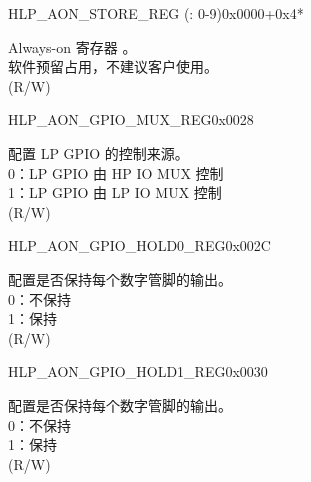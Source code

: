 \begin{register}{H}{LP\_AON\_STORE\_REG (: 0-9)}{0x0000+0x4*}\label{regdesc:LPAONSTORENREG}
%
\regnewline%
\begin{regdesc}\begin{reglist}
\label{fielddesc:LPAONLPAONSTOREN}\item [LP\_AON\_LP\_AON\_STORE\regindex{n}] Always-on 寄存器 。\\
软件预留占用，不建议客户使用。\\
(R/W)
\end{reglist}\end{regdesc}
\end{register}


\begin{register}{H}{LP\_AON\_GPIO\_MUX\_REG}{0x0028}\label{regdesc:LPAONGPIOMUXREG}
%
%
\regnewline%
\begin{regdesc}\begin{reglist}
\label{fielddesc:LPAONGPIOMUXSEL}\item [LP\_AON\_GPIO\_MUX\_SEL] 配置 LP GPIO 的控制来源。\\
0：LP GPIO 由 HP IO MUX 控制\\
1：LP GPIO 由 LP IO MUX 控制\\
(R/W)
\end{reglist}\end{regdesc}
\end{register}


\begin{register}{H}{LP\_AON\_GPIO\_HOLD0\_REG}{0x002C}\label{regdesc:LPAONGPIOHOLD0REG}
%
\regnewline%
\begin{regdesc}\begin{reglist}
\label{fielddesc:LPAONGPIOHOLD0}\item [LP\_AON\_GPIO\_HOLD0] 配置是否保持每个数字管脚的输出。\\
0：不保持\\
1：保持\\
(R/W)
\end{reglist}\end{regdesc}
\end{register}


\begin{register}{H}{LP\_AON\_GPIO\_HOLD1\_REG}{0x0030}\label{regdesc:LPAONGPIOHOLD1REG}
%
\regnewline%
\begin{regdesc}\begin{reglist}
\label{fielddesc:LPAONGPIOHOLD1}\item [LP\_AON\_GPIO\_HOLD1] 配置是否保持每个数字管脚的输出。\\
0：不保持\\
1：保持\\
(R/W)
\end{reglist}\end{regdesc}
\end{register}


